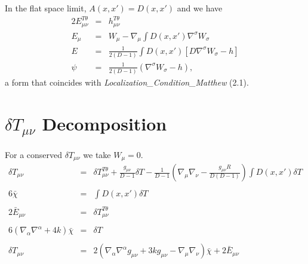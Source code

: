 \documentclass[10pt,letterpaper]{article}
\numberwithin{equation}{section}
\begin{document}
In the flat space limit, $A(x,x')=D(x,x')$ and we have
\begin{eqnarray}
2E_{\mu\nu}^{T\theta} &=& h_{\mu\nu}^{T\theta}
\nonumber\\
E_\mu &=& W_\mu - \nabla_\mu\int D(x,x')\nabla^\sigma W_\sigma
\nonumber\\
E &=& \frac{1}{2(D-1)}\int D(x,x') [D\nabla^\sigma W_\sigma -h]
\nonumber\\ 
\psi &=& \frac{1}{2(D-1)}\left( \nabla^\sigma W_\sigma -h \right),
\end{eqnarray}
a form that coincides with \emph{Localization\_Condition\_Matthew} (2.1). 
\section{$\delta T_{\mu\nu}$ Decomposition}
For a conserved $\delta T_{\mu\nu}$ we take $W_\mu=0$.
\begin{eqnarray}
\delta T_{\mu\nu} &=& \delta T_{\mu\nu}^{T\theta} + \frac{g_{\mu\nu}}{D-1} \delta T
-\frac{1}{D-1}\left(\nabla_\mu\nabla_\nu - \frac{g_{\mu\nu}R}{D(D-1)}\right)\int D(x,x') \delta T 
\nonumber\\ \nonumber\\
6\bar\chi &=&\int D(x,x')\delta T
\nonumber\\ \nonumber\\
2\bar E_{\mu\nu} &=& \delta T_{\mu\nu}^{T\theta}
\nonumber\\ \nonumber\\
6(\nabla_\alpha\nabla^\alpha + 4k)\bar\chi &=& \delta T
\nonumber\\ \nonumber\\
\delta T_{\mu\nu} &=& 
2\left( \nabla_\alpha\nabla^\alpha g_{\mu\nu} +3k g_{\mu\nu} - \nabla_\mu\nabla_\nu\right)\bar\chi + 2\bar E_{\mu\nu}
\end{eqnarray}

\end{document}
